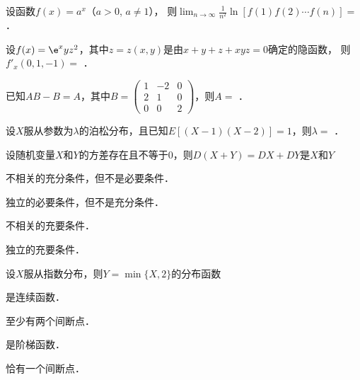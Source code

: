 \documentclass[plain,noanswer,medmath]{../../template/jnuexam}
\begin{document}






\begin{problem}
设函数$f(x) = a^x$（$a > 0$, $a \ne 1$），
则$\lim_{n \to \infty} \frac{1}{n^2}\ln[f(1)f(2) \cdots f(n)] =$ \fillin{}．
\end{problem}


\begin{problem}
设$f(x) = \e^x yz^2$，其中$z = z(x,y)$是由$x + y + z + xyz = 0$确定的隐函数，
则$f'_x(0,1, - 1) =$ \fillin{}．
\end{problem}




\begin{problem}
已知$AB - B = A$，其中$B = \begin{pmatrix}
  1 & -2 & 0 \\
  2 &  1 & 0 \\
  0 &  0 & 2
\end{pmatrix}$，则$A =$ \fillin{}．
\end{problem}


\begin{problem}
设$X$服从参数为$\lambda$的泊松分布，且已知$E[(X - 1)(X - 2)] = 1$，则$\lambda =$ \fillin{}．
\end{problem}










\begin{problem}
设随机变量$X$和$Y$的方差存在且不等于$0$，则$D(X + Y) = DX + DY$是$X$和$Y$\pickout{}
\begin{abcd}
\item 不相关的充分条件，但不是必要条件．
\item 独立的必要条件，但不是充分条件．
\item 不相关的充要条件．
\item 独立的充要条件．
\end{abcd}
\end{problem}


\begin{problem}
设$X$服从指数分布，则$Y = \min \{X,2\}$的分布函数\pickout{}
\begin{abcd}
\item 是连续函数．
\item 至少有两个间断点．
\item 是阶梯函数．
\item 恰有一个间断点．
\end{abcd}
\end{problem}
\end{document}
